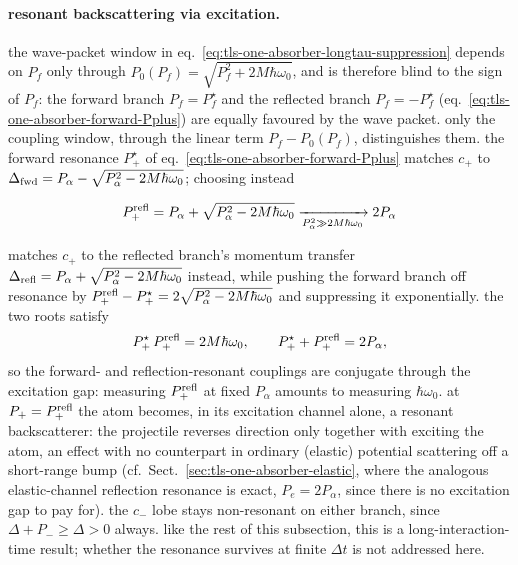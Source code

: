 \paragraph{resonant backscattering via excitation.} the wave-packet window in eq.~\eqref{eq:tls-one-absorber-longtau-suppression} depends on $P_f$ only through $P_0(P_f)=\sqrt{P_f^2+2M\hbar\omega_0}$, and is therefore blind to the sign of $P_f$: the forward branch $P_f=P_f^\star$ and the reflected branch $P_f=-P_f^\star$ (eq.~\eqref{eq:tls-one-absorber-forward-Pplus}) are equally favoured by the wave packet. only the coupling window, through the linear term $P_f-P_0(P_f)$, distinguishes them. the forward resonance $P_+^\star$ of eq.~\eqref{eq:tls-one-absorber-forward-Pplus} matches $c_+$ to $\Delta_{\rm fwd}=P_\alpha-\sqrt{P_\alpha^2-2M\hbar\omega_0}$; choosing instead
\begin{importantbox}
    \begin{align}
        P_+^{\rm refl} = P_\alpha+\sqrt{P_\alpha^2-2M\hbar\omega_0} \xrightarrow[P_\alpha^2\gg2M\hbar\omega_0]{} 2P_\alpha\label{eq:tls-one-absorber-reflection-Pplus}
    \end{align}
\end{importantbox}
matches $c_+$ to the reflected branch's momentum transfer $\Delta_{\rm refl}=P_\alpha+\sqrt{P_\alpha^2-2M\hbar\omega_0}$ instead, while pushing the forward branch off resonance by $P_+^{\rm refl}-P_+^\star=2\sqrt{P_\alpha^2-2M\hbar\omega_0}$ and suppressing it exponentially. the two roots satisfy
\begin{align}
    P_+^\star\,P_+^{\rm refl} = 2M\hbar\omega_0,\qquad P_+^\star+P_+^{\rm refl}=2P_\alpha,\label{eq:tls-one-absorber-reflection-identity}
\end{align}
so the forward- and reflection-resonant couplings are conjugate through the excitation gap: measuring $P_+^{\rm refl}$ at fixed $P_\alpha$ amounts to measuring $\hbar\omega_0$. at $P_+=P_+^{\rm refl}$ the atom becomes, in its excitation channel alone, a resonant backscatterer: the projectile reverses direction only together with exciting the atom, an effect with no counterpart in ordinary (elastic) potential scattering off a short-range bump (cf.\ Sect.~\ref{sec:tls-one-absorber-elastic}, where the analogous elastic-channel reflection resonance is exact, $P_e=2P_\alpha$, since there is no excitation gap to pay for). the $c_-$ lobe stays non-resonant on either branch, since $\Delta+P_-\ge\Delta>0$ always. like the rest of this subsection, this is a long-interaction-time result; whether the resonance survives at finite $\Delta t$ is not addressed here.

